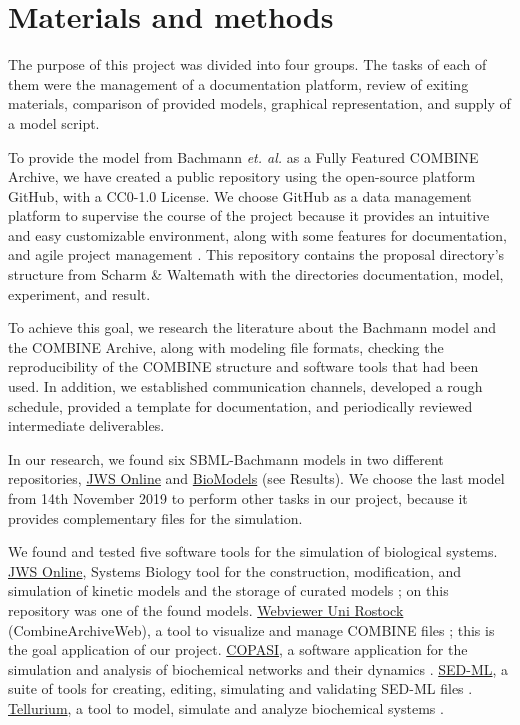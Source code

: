 \section*{Materials and methods} \label{matmet}

The purpose of this project was divided into four groups. The tasks of each of them were the management of a documentation platform, review of exiting materials, comparison of provided models, graphical representation, and supply of a model script.

To provide the model from Bachmann \textit{et. al.}\cite{bachmannmodel} as a Fully Featured COMBINE Archive, we have created a public repository using the open-source platform GitHub, with a CC0-1.0 License. We choose GitHub as a data management platform to supervise the course of the project because it provides an intuitive and easy customizable environment, along with some features for documentation, and agile project management \cite{github}. This repository contains the proposal directory's structure from Scharm \& Waltemath \cite{combine} with the directories documentation, model, experiment, and result.

To achieve this goal, we research the literature about the Bachmann model and the COMBINE Archive, along with modeling file formats, checking the reproducibility of the COMBINE structure and software tools that had been used. In addition, we established communication channels, developed a rough schedule, provided a template for documentation, and periodically reviewed intermediate deliverables. 

In our research, we found six SBML-Bachmann models in two different repositories, \hyperlink{https://www.systemsmedicine.net/posts/jws-online-biological-systems-modelling}{JWS Online} and \hyperlink{https://www.ebi.ac.uk/biomodels/}{BioModels} (see Results). We choose the last model from 14th November 2019 to perform other tasks in our project, because it provides complementary files for the simulation.

We found and tested five software tools for the simulation of biological systems. \hyperlink{https://www.systemsmedicine.net/posts/jws-online-biological-systems-modelling}{JWS Online}, Systems Biology tool for the construction, modification, and simulation of kinetic models and the storage of curated models \cite{jwsonline}; on this repository was one of the found models. \hyperlink{https://cat.bio.informatik.uni-rostock.de/}{Webviewer Uni Rostock} (CombineArchiveWeb), a tool to visualize and manage COMBINE files \cite{combine}; this is the goal application of our project. \hyperlink{http://copasi.org/}{COPASI}, a software application for the simulation and analysis of biochemical networks and their dynamics \cite{copasi}. \hyperlink{https://sed-ml.org/}{SED-ML}, a suite of tools for creating, editing, simulating and validating SED-ML files \cite{sedml}. \hyperlink{https://tellurium.readthedocs.io/en/latest/}{Tellurium},  a tool to model, simulate and analyze biochemical systems \cite{tellurium}.

